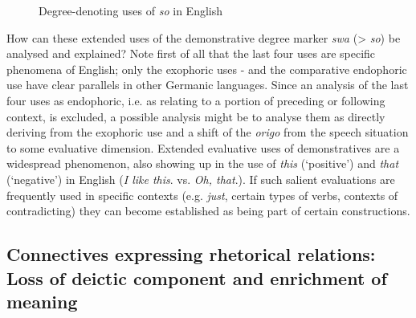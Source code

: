 \documentclass[output=paper,colorlinks,citecolor=brown]{langscibook}
\begin{document}
\begin{figure}
    \caption{Degree-denoting uses of \textit{so} in English}
    \label{fig:koenig:2}
\end{figure}

How can these extended uses of the demonstrative degree marker \textit{swa} (> \textit{so}) be analysed and explained? Note first of all that the last four uses are specific phenomena of English; only the exophoric uses - and the comparative endophoric use  have clear parallels in other Germanic languages. Since an analysis of the last four uses as endophoric, i.e. as relating to a portion of preceding or following context, is excluded, a possible analysis might be to analyse them as directly deriving from the exophoric use and a shift of the \textit{origo} from the speech situation to some evaluative dimension. Extended evaluative uses of demonstratives are a widespread phenomenon, also showing up in the use of \textit{this} (‘positive’) and \textit{that} (‘negative’) in English (\textit{I like this}. vs. \textit{Oh, that}.). If such salient evaluations are frequently used in specific contexts (e.g. \textit{just}, certain types of verbs, contexts of contradicting) they can become established as being part of certain constructions.

\subsection{Connectives expressing rhetorical relations: Loss of deictic component and enrichment of meaning}
\end{document}
